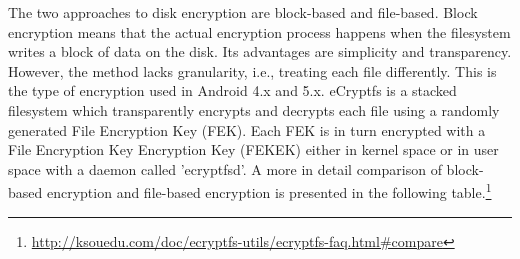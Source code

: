 The two approaches to disk encryption are block-based and file-based. Block encryption means that the actual encryption process happens when the filesystem writes a block of data on the disk. Its advantages are simplicity and transparency. However, the method lacks granularity, i.e., treating each file differently. This is the type of encryption used in Android 4.x and 5.x.
eCryptfs is a stacked filesystem which transparently encrypts and decrypts each file using a randomly generated File Encryption Key (FEK). Each FEK is in turn encrypted with a File Encryption Key Encryption Key (FEKEK) either in kernel space or in user space with a daemon called 'ecryptfsd'.
A more in detail comparison of block-based encryption and file-based encryption is presented in the following table.\footnote{\url{http://ksouedu.com/doc/ecryptfs-utils/ecryptfs-faq.html\#compare}}


